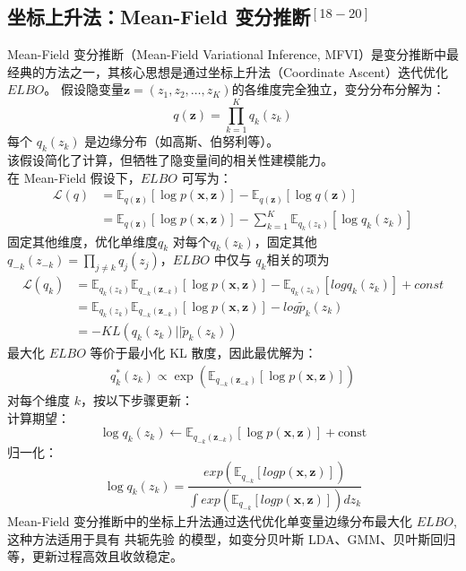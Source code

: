 \documentclass[final]{ws-ijseke}
\begin{document}
\subsection{坐标上升法：Mean-Field 变分推断$^{[18-20]}$}
Mean-Field 变分推断（Mean-Field Variational Inference, MFVI）是变分推断中最经典的方法之一，其核心思想是通过坐标上升法（Coordinate Ascent）迭代优化 $ELBO$。
假设隐变量$\mathbf{z} = (z_1,z_2,\dots,z_K)$的各维度完全独立，变分分布分解为：
\begin{equation*}
   q(\mathbf{z}) = \prod_{k=1}^K q_k(z_k)
\end{equation*}
每个 $q_k(z_k)$ 是边缘分布（如高斯、伯努利等）。\\
该假设简化了计算，但牺牲了隐变量间的相关性建模能力。\\
在 Mean-Field 假设下，$ELBO$ 可写为：
\begin{align*}
   \mathcal L(q) &= \mathbb{E}_{q(\mathbf{z})}[\log p(\mathbf{x},\mathbf{z})] - \mathbb{E}_{q(\mathbf{z})}[\log q(\mathbf{z})]\\&=\mathbb{E}_{q(\mathbf{z})}[\log p(\mathbf{x},\mathbf{z})] - \sum_{k=1}^K \mathbb{E}_{q_k(z_k)}[\log q_k(z_k)]
\end{align*}
\hspace*{2em} 固定其他维度，优化单维度$q_k$
 对每个$q_k(z_k)$，固定其他$q_{-k}(z_{-k}) = \prod_{j\neq k}q_j(z_j)$，$ELBO$ 中仅与 $q_k$相关的项为
\begin{align*}
\mathcal L(q_k) &= \mathbb{E}_{q_k(z_k)}\mathbb{E}_{q_{-k}(\mathbf{z}_{-k})}[\log p(\mathbf{x},\mathbf{z})] - \mathbb{E}_{q_k(z_k)}[logq_k(z_k)] + const \\ &=\mathbb{E}_{q_k(z_k)}\mathbb{E}_{q_{-k}(\mathbf{z}_{-k})}[\log p(\mathbf{x},\mathbf{z})] - log\tilde{p}_k(z_k)
\\&= - KL(q_k(z_k)||\tilde{p}_k(z_k))
\end{align*}
最大化 $ELBO$ 等价于最小化 KL 散度，因此最优解为：
\begin{align*}
q_k^*(z_k) \propto \exp\left(\mathbb{E}_{q_{-k}(\mathbf{z}_{-k})}[\log p(\mathbf{x},\mathbf{z})]\right)
\end{align*}
对每个维度 $k$，按以下步骤更新：\\
计算期望：
\begin{equation*}
\log q_k(z_k) ← \mathbb{E}_{q_{-k}(\mathbf{z}_{-k})}[\log p(\mathbf{x},\mathbf{z})] + \text{const}
\end{equation*}
归一化：
\begin{equation*}
\log q_k(z_k) = \frac{exp(\mathbb{E}_{q_{-k}}[logp(\mathbf{x},\mathbf{z})])}{\int exp(\mathbb{E}_{q_{-k}}[logp(\mathbf{x},\mathbf{z})])dz_k}
\end{equation*}
\hspace*{2em} Mean-Field 变分推断中的坐标上升法通过迭代优化单变量边缘分布最大化 $ELBO$, 这种方法适用于具有 共轭先验 的模型，如变分贝叶斯 LDA、GMM、贝叶斯回归等，更新过程高效且收敛稳定。
\end{document}
